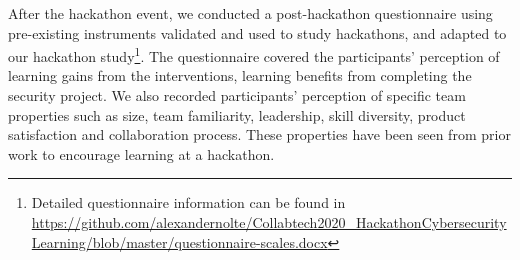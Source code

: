 \documentclass[runningheads]{llncs}
\begin{document}
After the hackathon event, we conducted a post-hackathon questionnaire using pre-existing instruments validated and used to study hackathons\cite{van2015scrutinizing,filippova2017diversity,bhattacherjee2001understanding}, and adapted to our hackathon study\footnote{Detailed questionnaire information can be found in \url{https://github.com/alexandernolte/Collabtech2020_HackathonCybersecurityLearning/blob/master/questionnaire-scales.docx}}. The questionnaire covered the participants' perception of learning gains from the interventions, learning benefits from completing the security project. We also recorded participants' perception of specific team properties such as size, team familiarity, leadership, skill diversity, product satisfaction and collaboration process. These properties have been seen from prior work\cite{filippova2017diversity} to encourage learning at a hackathon. 
\end{document}
